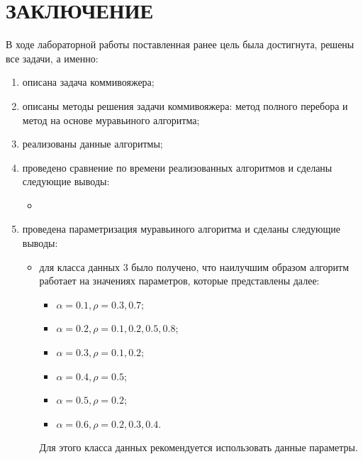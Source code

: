\chapter*{ЗАКЛЮЧЕНИЕ}

В ходе лабораторной работы поставленная ранее цель была достигнута, решены все задачи, а именно:
\begin{enumerate}
	\item описана задача коммивояжера;
	\item описаны методы решения задачи коммивояжера: метод полного перебора и метод на основе муравьиного алгоритма;
	\item реализованы данные алгоритмы;
	\item проведено сравнение по времени реализованных алгоритмов и сделаны следующие выводы:
	\begin{itemize}
		\item 
	\end{itemize}
	\item проведена параметризация муравьиного алгоритма и сделаны следующие выводы:
	\begin{itemize}
		\item для класса данных 3 было получено, что наилучшим образом алгоритм работает на значениях параметров, которые представлены далее:
		\begin{itemize}[label=---]
			\item $\alpha = 0.1, \rho = 0.3, 0.7$;
			\item $\alpha = 0.2, \rho = 0.1, 0.2, 0.5, 0.8$;
			\item $\alpha = 0.3, \rho = 0.1, 0.2$;
			\item $\alpha = 0.4, \rho = 0.5$;
			\item $\alpha = 0.5, \rho = 0.2$;
			\item $\alpha = 0.6, \rho = 0.2, 0.3, 0.4$.
		\end{itemize} 
		
		Для этого класса данных рекомендуется использовать данные параметры.
	\end{itemize}
\end{enumerate}